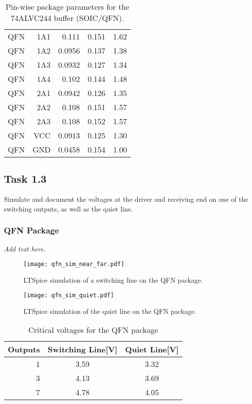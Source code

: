\documentclass[../main.tex]{subfiles}
\begin{document}
\begin{table}[h]
\begin{tabular}{r|r r r r}
        QFN  & 1A1  & 0.111  & 0.151 & 1.62 \\
        QFN  & 1A2  & 0.0956 & 0.137 & 1.38 \\
        QFN  & 1A3  & 0.0932 & 0.127 & 1.34 \\
        QFN  & 1A4  & 0.102  & 0.144 & 1.48 \\
        QFN  & 2A1  & 0.0942 & 0.126 & 1.35 \\
        QFN  & 2A2  & 0.108  & 0.151 & 1.57 \\
        QFN  & 2A3  & 0.108  & 0.152 & 1.57 \\
        \midrule
        QFN  & VCC  & 0.0913 & 0.125 & 1.30 \\
        QFN  & GND  & 0.0458 & 0.154 & 1.00 \\
        \bottomrule[1pt]
    \end{tabular}
    \caption{Pin-wise package parameters for the 74ALVC244 buffer (SOIC/QFN).}
    \label{tab:pkg-params}
\end{table}

\newpage

\subsection{Task 1.3}

Simulate and document the voltages at the driver and receiving end on one of the switching outputs, as well as the quiet line.

\subsubsection{QFN Package}

\textit{Add text here.}
\lipsum[2]

\begin{figure}[h]
    \centering
    \texttt{[image: qfn\_sim\_near\_far.pdf]}
    \caption{LTSpice simulation of a switching line on the QFN package.}
    \label{fig:qfn_sim_near_far}
\end{figure}

\newpage

\begin{figure}[h]
    \centering
    \texttt{[image: qfn\_sim\_quiet.pdf]}
    \caption{LTSpice simulation of the quiet line on the QFN package.}
    \label{fig:qfn_sim_quiet}
\end{figure}

\begin{table}[h]
    \centering
    \begin{tabular}{r|c c}
        \toprule[1pt]
        \textbf{Outputs} & \textbf{Switching Line[V]} &\textbf{Quiet Line[V]} \\
        \midrule
        1  & 3.59  & 3.32 \\
        3  & 4.13  & 3.69 \\
        7  & 4.78  & 4.05  \\
        \bottomrule[1pt]
    \end{tabular}
    \caption{Critical voltages for the QFN package}
\end{table}
\end{document}
